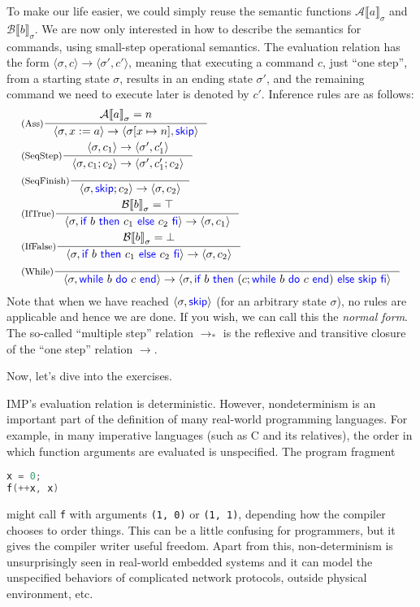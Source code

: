 \documentclass[11pt,a4paper]{article}
\let\t\texttt
\newcommand{\toM}{\to_{*}}
\newcommand{\pair}[1]{\langle #1 \rangle}
\newcommand{\evalA}[2]{{\mathcal{A}\llbracket #1 \rrbracket}_{#2}}
\newcommand{\evalB}[2]{{\mathcal{B}\llbracket #1 \rrbracket}_{#2}}
\newcommand{\evalCS}[4]{\pair{#1, #2} \rightarrow \pair{#3, #4}}
\newcommand{\kword}[1]{{\color{blue} \textsf{#1}}}
\newcommand{\Skip}{\kword{skip}}
\newcommand{\If}{\kword{if}}
\newcommand{\Then}{\kword{then}}
\newcommand{\Else}{\kword{else}}
\newcommand{\Fi}{\kword{fi}}
\newcommand{\While}{\kword{while}}
\newcommand{\Do}{\kword{do}}
\newcommand{\End}{\kword{end}}
\begin{document}
To make our life easier, we could simply reuse the semantic functions $\evalA{a}{\sigma}$ and $\evalB{b}{\sigma}$.
We are now only interested in how to describe the semantics for commands, using small-step operational semantics.
The evaluation relation has the form $\evalCS{\sigma}{c}{\sigma'}{c'}$, meaning that executing a command $c$, just ``one step'', from a starting state $\sigma$, results in an ending state $\sigma'$, and the remaining command we need to execute later is denoted by $c'$.
Inference rules are as follows:
\begin{align*}
	& \inference[(Ass)]{\evalA{a}{\sigma}=n}{\evalCS{\sigma}{x:=a}{\sigma[x\mapsto n]}{\Skip}} \\
	& \inference[(SeqStep)]{\evalCS{\sigma}{c_1}{\sigma'}{c_1'}}{\evalCS{\sigma}{c_1;c_2}{\sigma'}{c_1';c_2}} \\
	& \inference[(SeqFinish)]{}{\evalCS{\sigma}{\Skip;c_2}{\sigma}{c_2}} \\
	& \inference[(IfTrue)]{\evalB{b}{\sigma}=\top}{\evalCS{\sigma}{\If~b~\Then~c_1~\Else~c_2~\Fi}{\sigma}{c_1}} \\
	& \inference[(IfFalse)]{\evalB{b}{\sigma}=\bot}{\evalCS{\sigma}{\If~b~\Then~c_1~\Else~c_2~\Fi}{\sigma}{c_2}} \\
	& \inference[(While)]{}
		{\evalCS{\sigma}{\While~b~\Do~c~\End}{\sigma}{\If~b~\Then~(c; \While~b~\Do~c~\End)~\Else~\Skip~\Fi}}
\end{align*}
Note that when we have reached $\pair{\sigma,\Skip}$ (for an arbitrary state $\sigma$), no rules are applicable and hence we are done.
If you wish, we can call this the \emph{normal form}.
The so-called ``multiple step'' relation $\toM$ is the reflexive and transitive closure of the ``one step'' relation $\to$.

Now, let's dive into the exercises.


IMP's evaluation relation is deterministic.
However, nondeterminism is an important part of the definition of many real-world programming languages.
For example, in many imperative languages (such as C and its relatives), the order in which function arguments are evaluated is unspecified.
The program fragment
\begin{lstlisting}[language=C]
x = 0;
f(++x, x)
\end{lstlisting}
might call \t{f} with arguments \t{(1, 0)} or \t{(1, 1)}, depending how the compiler chooses to order things.
This can be a little confusing for programmers, but it gives the compiler writer useful freedom.
Apart from this, non-determinism is unsurprisingly seen in real-world embedded systems and it can model the unspecified behaviors of complicated network protocols, outside physical environment, etc.
\end{document}
